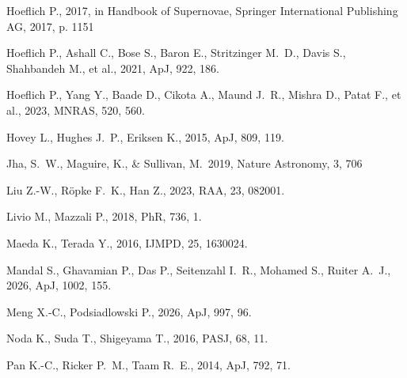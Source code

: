 \documentclass[twocolumn]{aastex701}
\begin{document}
\begin{thebibliography}{}
 Hoeflich P., 2017, in Handbook of Supernovae, Springer International Publishing AG, 2017, p. 1151 


 Hoeflich P., Ashall C., Bose S., Baron E., Stritzinger M.~D., Davis S., Shahbandeh M., et al., 2021, ApJ, 922, 186. 

 Hoeflich P., Yang Y., Baade D., Cikota A., Maund J.~R., Mishra D., Patat F., et al., 2023, MNRAS, 520, 560. 

 Hovey L., Hughes J.~P., Eriksen K., 2015, ApJ, 809, 119. 

 Jha, S.~W., Maguire, K., \& Sullivan, M.\ 2019, Nature Astronomy, 3, 706

 Liu Z.-W., R{\"o}pke F.~K., Han Z., 2023, RAA, 23, 082001. 

 Livio M., Mazzali P., 2018, PhR, 736, 1. 

 Maeda K., Terada Y., 2016, IJMPD, 25, 1630024. 

 Mandal S., Ghavamian P., Das P., Seitenzahl I.~R., Mohamed S., Ruiter A.~J., 2026, ApJ, 1002, 155. 

 Meng X.-C., Podsiadlowski P., 2026, ApJ, 997, 96. 

 Noda K., Suda T., Shigeyama T., 2016, PASJ, 68, 11. 

 Pan K.-C., Ricker P.~M., Taam R.~E., 2014, ApJ, 792, 71. 


\end{thebibliography}
\end{document}
